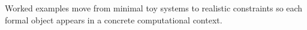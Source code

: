 Worked examples move from minimal toy systems to realistic constraints so each formal object appears in a concrete computational context.
